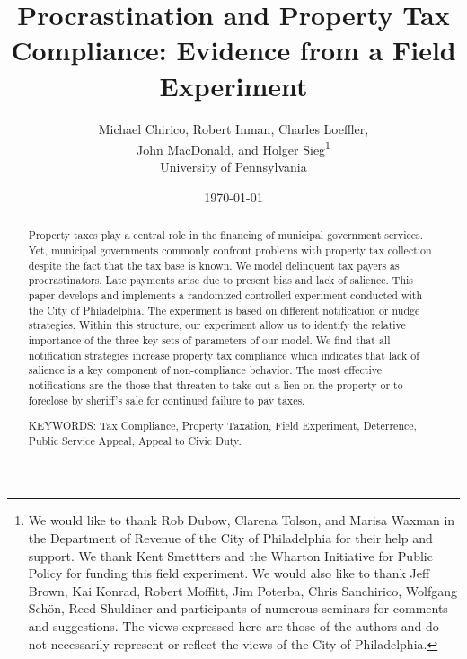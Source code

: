 \documentclass[12pt]{article}
\renewcommand{\thefootnote}{\fnsymbol{footnote}}
\begin{document}
\title{Procrastination and Property Tax Compliance: Evidence from a Field Experiment}

\author{Michael Chirico, Robert Inman, Charles Loeffler, \\ 
John MacDonald, and Holger Sieg\thanks{We would like to thank Rob Dubow,
    Clarena Tolson, and Marisa Waxman in the Department of Revenue of
    the City of Philadelphia for their help and support. We thank Kent
    Smettters and the Wharton Initiative for Public Policy for funding
    this field experiment. We would also like to thank Jeff Brown, Kai
    Konrad, Robert Moffitt, Jim Poterba, Chris Sanchirico, Wolfgang
    Sch\"on, Reed Shuldiner and participants of numerous seminars for
    comments and suggestions. The views expressed here are those of
    the authors and do not necessarily represent or reflect the views
    of the City of Philadelphia.}  \\ 
University of Pennsylvania}

\date{\today}

\maketitle

\begin{abstract}

Property taxes play a central role in the financing of municipal
government services. Yet, municipal governments commonly confront
problems with property tax collection despite the fact that the tax
base is known.  We model delinquent tax payers as
procrastinators. Late payments arise due to present bias and lack of
salience.  This paper develops and implements a randomized controlled
experiment conducted with the City of Philadelphia. The experiment is
based on different notification or nudge strategies.  Within this
structure, our experiment allow us to identify the relative importance
of the three key sets of parameters of our model.  We find that all
notification strategies increase property tax compliance which
indicates that lack of salience is a key component of non-compliance
behavior.  The most effective notifications are the those that
threaten to take out a lien on the property or to foreclose by
sheriff's sale for continued failure to pay taxes.

\bigskip

\noindent KEYWORDS: Tax Compliance, Property Taxation, Field
Experiment, Deterrence, Public Service Appeal, Appeal to Civic Duty.

\end{abstract}
\renewcommand{\thefootnote}{\arabic{footnote}}
\end{document}
